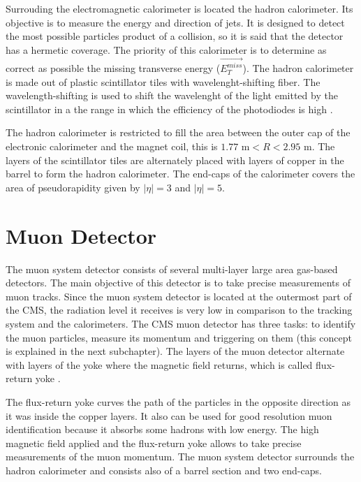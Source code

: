 Surrouding the electromagnetic calorimeter is located the hadron calorimeter. Its objective is to measure the energy and direction of jets. It is designed to detect the most possible particles product of a collision, so it is said that the detector has a hermetic coverage. The priority of this calorimeter is to determine as correct as possible the missing transverse energy ($\vec{E_T^{miss}}$). The hadron calorimeter is made out of plastic scintillator tiles with wavelenght-shifting fiber. The wavelength-shifting is used to shift the wavelenght of the light emitted by the scintillator in a the range in which the efficiency of the photodiodes is high \cite{Perspectives_LHC}.

The hadron calorimeter is restricted to fill the area between the outer cap of the electronic calorimeter and the magnet coil, this is $1.77 \text{ m} < R < 2.95 \text{ m}$. The layers of the scintillator tiles are alternately placed with layers of copper in the barrel to form the hadron calorimeter. The end-caps of the calorimeter covers the area of pseudorapidity given by $|\eta|= 3$ and $|\eta|= 5$.


\section{Muon Detector}

The muon system detector consists of several multi-layer large area gas-based detectors. The main objective of this detector is to take precise measurements of muon tracks. Since the muon system 
detector is located at the outermost part of the CMS, the radiation level it receives is very low in comparison to the tracking system and the calorimeters. The CMS muon detector has three tasks: 
to identify the muon particles, measure its momentum and triggering on them (this concept is explained in the next subchapter). The layers of the muon detector alternate with layers of the yoke where 
the magnetic field returns, which is called flux-return yoke \cite{Perspectives_LHC}. 

The flux-return yoke curves the path of the particles in the opposite direction as it was inside the copper layers. It also can be used for good resolution muon identification because it absorbs 
some hadrons with low energy. The high magnetic field applied and the flux-return yoke allows to take precise measurements of the muon momentum. The muon system detector surrounds the hadron
calorimeter and consists also of a barrel section and two end-caps. 

